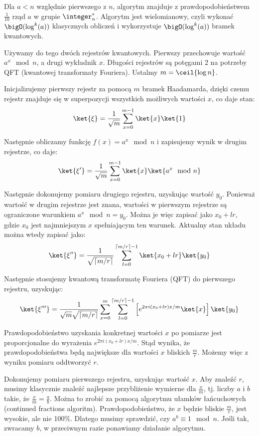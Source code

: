 Dla \( a < n \) względnie pierwszego z \( n \), algorytm znajduje z prawdopodobieństwem \( \frac{1}{10} \) rząd \( a \) w grupie \( \integer_n^* \). 
Algorytm jest wielomianowy, czyli wykonać \( \bigO(\log^k(a)) \) klasycznych obliczeń i wykorzystuje \( \bigO(\log^k(a)) \) bramek kwantowych.

Używamy do tego dwóch rejestrów kwantowych. Pierwszy przechowuje wartość \( a^x \mod n \), a drugi wykładnik \( x \). Długości rejestrów są potęgami 2 na potrzeby QFT (kwantowej transformaty Fouriera). Ustalmy \( m = \ceil{\log n} \).

Inicjalizujemy pierwszy rejestr za pomocą \( m \) bramek Haadamarda, dzięki czemu rejestr znajduje się w superpozycji wszystkich możliwych wartości \( x \), co daje stan:
\begin{align*}
    \ket{\xi} = \frac{1}{\sqrt{m}}\sum_{x=0}^{m-1} \ket{x} \ket{1}
\end{align*}

Następnie obliczamy funkcję \( f(x)=a^x \mod n \) i zapisujemy wynik w drugim rejestrze, co daje:
\begin{align*}
    \ket{\xi'} = \frac{1}{\sqrt{m}}\sum_{x=0}^{m-1} \ket{x} \ket{a^x \mod n}
\end{align*}

Następnie dokonujemy pomiaru drugiego rejestru, uzyskując wartość \( y_0 \). Ponieważ wartość w drugim rejestrze jest znana, wartości w pierwszym rejestrze są ograniczone warunkiem \( a^x \mod n = y_0 \). Można je więc zapisać jako \( x_0 + lr \), gdzie \( x_0 \) jest najmniejszym \( x \) spełniającym ten warunek. Aktualny stan układu można wtedy zapisać jako:
\begin{align*}
  \ket{\xi''} = \frac{1}{\sqrt{\lceil m/r \rceil}} \sum_{l=0}^{\lceil m/r \rceil-1} \ket{x_0 + lr} \ket{y_0}
\end{align*}

Następnie stosujemy kwantową transformatę Fouriera (QFT) do pierwszego rejestru, uzyskując:
\begin{align*}
  \ket{\xi'''} = \frac{1}{\sqrt{m} \sqrt{\lceil m/r \rceil}} \sum_{x=0}^{m} \sum_{l=0}^{\lceil m/r \rceil-1} \left[ e^{2\pi i (x_0 + lr)x/m} \ket{x} \right] \ket{y_0}
\end{align*}

Prawdopodobieństwo uzyskania konkretnej wartości \( x \) po pomiarze jest proporcjonalne do wyrażenia \( e^{2\pi i (x_0 + lr)x/m} \). Stąd wynika, że prawdopodobieństwa będą największe dla wartości \( x \) bliskich \( \frac{m}{r} \). Możemy więc z wyniku pomiaru oddtworzyć \( r \).


Dokonujemy pomiaru pierwszego rejestru, uzyskując wartość \( x \). Aby znaleźć \( r \), musimy klasycznie znaleźć najlepsze przybliżenie wymierne dla \( \frac{x}{m} \), tj. liczby \( a \) i \( b \) takie, że \( \frac{x}{m} = \frac{a}{b} \). Można to zrobić za pomocą algorytmu ułamków łańcuchowych (continued fractions algoritm). Prawdopodobieństwo, że \( x \) będzie bliskie \( \frac{m}{r} \), jest wysokie, ale nie 100\%. Dlatego musimy sprawdzić, czy \( a^b \equiv 1 \mod n \). Jeśli tak, zwracamy \( b \), w przeciwnym razie ponawiamy działanie algorytmu.
